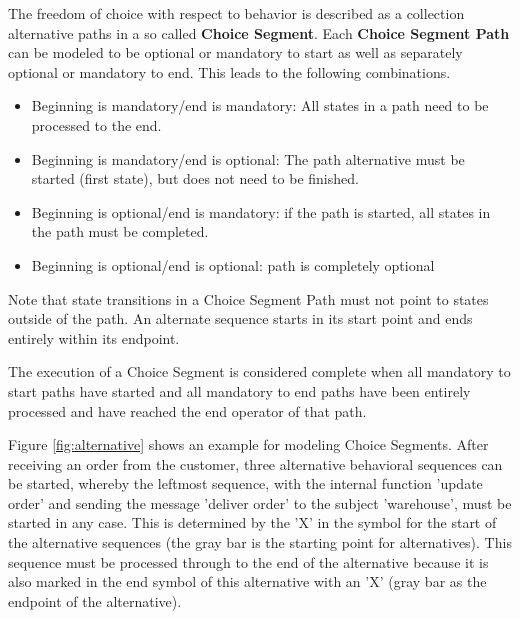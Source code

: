 The freedom of choice with respect to behavior is described as a collection alternative paths in a so called \textbf{Choice Segment}. Each \textbf{Choice Segment Path} can be modeled to be optional or mandatory to start as well as separately optional or mandatory to end. This leads to the following combinations.

\begin{itemize}
	\item Beginning is mandatory/end is mandatory: All states in a path need to be processed to the end.
	\item Beginning is mandatory/end is optional: The path alternative must be started (first state), but does not need to be finished. 
	\item Beginning is optional/end is mandatory: if the path is started, all states in the path must be completed.
	\item Beginning is optional/end is optional: path is completely optional
\end{itemize}

Note that state transitions in a Choice Segment Path must not point to states outside of the path. An alternate sequence starts in its start point and ends entirely within its endpoint.

The execution of a Choice Segment is considered complete when all mandatory to start paths have started and all mandatory to end paths have been entirely processed and have reached the end operator of that path.

Figure \ref{fig:alternative} shows an example for modeling Choice Segments. After receiving an order from the customer, three alternative behavioral sequences can be started, whereby the leftmost sequence, with the internal function 'update order' and sending the message 'deliver order' to the subject 'warehouse', must be started in any case. This is determined by the 'X' in the symbol for the start of the alternative sequences (the gray bar is the starting point for alternatives). This sequence must be processed through to the end of the alternative because it is also marked in the end symbol of this alternative with an 'X' (gray bar as the endpoint of the alternative).

